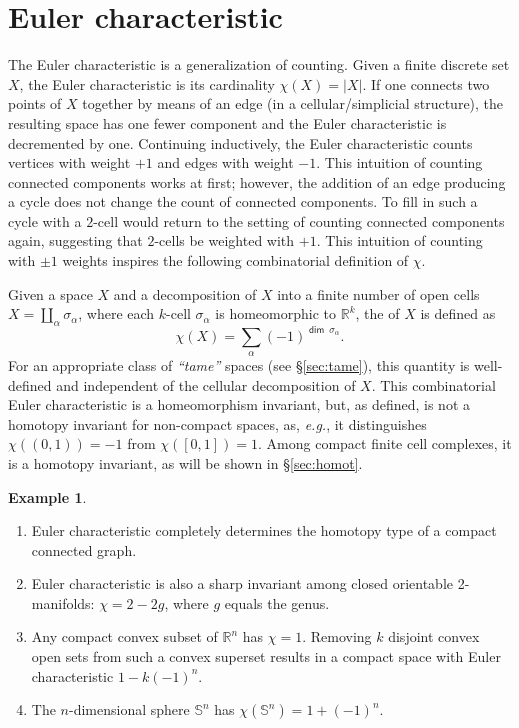 \documentclass{psapm-l}
\theoremstyle{definition}
\newtheorem{example}[theorem]{Example}
\theoremstyle{remark}
\numberwithin{equation}{section}
\begin{document}
\section{Euler characteristic}
\label{sec:euler}

The Euler characteristic is a generalization of counting. Given a finite discrete set $X$, the Euler characteristic is its cardinality $\chi(X)={\left\vert{{X}}\right\vert}$. If one connects two points of $X$ together by means of an edge (in a cellular/simplicial structure), the resulting space has one fewer component and the Euler characteristic is decremented by one. Continuing inductively, the Euler characteristic counts vertices with weight $+1$ and edges with weight $-1$. This intuition of counting connected components works at first; however, the addition of an edge producing a cycle does not change the count of connected components. To fill in such a cycle with a $2$-cell would return to the setting of counting connected components again, suggesting that $2$-cells be weighted with $+1$. This intuition of counting with $\pm 1$ weights inspires the following combinatorial definition of $\chi$.

Given a space $X$ and a decomposition of $X$ into a finite number of open cells $X=\coprod_\alpha\sigma_\alpha$, where each $k$-cell $\sigma_\alpha$ is homeomorphic to ${{\mathbb R}}^k$, the {{}} of $X$ is defined as
\begin{equation}
    \chi(X) = \sum_\alpha (-1)^{{{{\operatorname{\mathsf{{dim}}}}}}\ \sigma_\alpha} .
\end{equation}
For an appropriate class of {\em ``tame''} spaces (see \S\ref{sec:tame}), this quantity is well-defined and independent of the cellular decomposition of $X$. This combinatorial Euler characteristic is a homeomorphism invariant, but, as defined, is not a homotopy invariant for non-compact spaces, as, {{\em e.g.}}, it distinguishes $\chi((0,1))=-1$ from $\chi([0,1])=1$. Among compact finite cell complexes, it is a homotopy invariant, as will be shown in \S\ref{sec:homot}.

\begin{example}
\begin{enumerate}
\item Euler characteristic completely determines the homotopy type of a compact connected graph.
\item Euler characteristic is also a sharp invariant among closed orientable 2-manifolds: $\chi=2-2g$, where $g$ equals the genus.
\item Any compact convex subset of ${{\mathbb R}}^n$ has $\chi=1$. Removing $k$ disjoint convex open sets from such a convex superset results in a compact space with Euler characteristic $1-k(-1)^n$.
\item The $n$-dimensional sphere ${{\mathbb S}}^n$ has $\chi({{\mathbb S}}^n)=1+(-1)^n$.
\end{enumerate}
\end{example}
\end{document}
